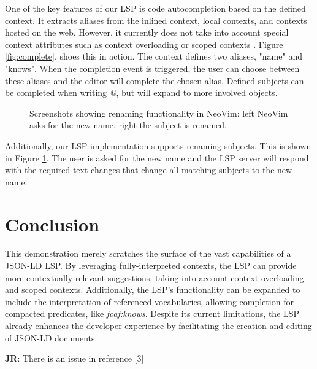 \documentclass[
]{ceurart}
\newcommand\jr[1]{{\color{Red}\textbf{JR}: #1}}
\begin{document}
One of the key features of our LSP is code autocompletion based on the defined context. It extracts aliases from the inlined context, local contexts, and contexts hosted on the web. However, it currently does not take into account special context attributes such as context overloading or scoped contexts \cite{JSON-LD-W3C}. Figure \ref{fig:complete}, shoes this in action. The context defines two aliases, "name" and "knows". When the completion event is triggered, the user can choose between these aliases and the editor will complete the chosen alias. Defined subjects can be completed when writing \textit{@}, but will expand to more involved objects.

\begin{figure}
\centering
{}
\caption{Screenshots showing renaming functionality in NeoVim: left NeoVim asks for the new name, right the subject is renamed.}
\label{fig:rename}
\end{figure}

Additionally, our LSP implementation supports renaming subjects. This is shown in Figure \ref{fig:rename}. The user is asked for the new name and the LSP server will respond with the required text changes that change all matching subjects to the new name.



\section{Conclusion}

This demonstration merely scratches the surface of the vast capabilities of a JSON-LD LSP.
By leveraging fully-interpreted contexts, the LSP can provide more contextually-relevant suggestions, taking into account context overloading and scoped contexts. 
Additionally, the LSP's functionality can be expanded to include the interpretation of referenced vocabularies, allowing completion for compacted predicates, like \textit{foaf:knows}.
Despite its current limitations, the LSP already enhances the developer experience by facilitating the creation and editing of JSON-LD documents.


\jr{There is an issue in reference [3]}

\end{document}
